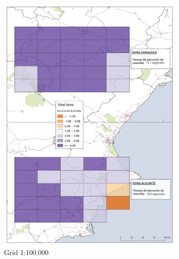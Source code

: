 \begin{figure}
\begin{subfigure}[b]{0.4\textwidth}
    \includegraphics[width=\textwidth]{ResultadosyDiscusion/Figs/Results/l_100.pdf}
    \caption{Grid 1:100.000}
    \label{fig:l_100}
  \end{subfigure}
    \begin{subfigure}[b]{0.4\textwidth}

\end{subfigure}
\end{figure}
